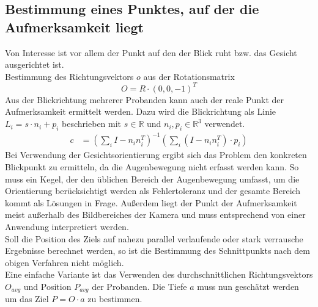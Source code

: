 \subsection{Bestimmung eines Punktes, auf der die Aufmerksamkeit liegt}
Von Interesse ist vor allem der Punkt auf den der Blick ruht bzw. das Gesicht ausgerichtet ist.\\
Bestimmung des Richtungsvektors $o$ aus der Rotationsmatrix
\[O= R\cdot (0,0,-1)^T\] 
Aus der Blickrichtung mehrerer Probanden kann auch der reale Punkt der Aufmerksamkeit ermittelt werden. Dazu wird die Blickrichtung als Linie $L_i = s \cdot n_i+ p_i$ beschrieben mit $s\in \mathbb{R}$ und $n_i,p_i \in \mathbb{R}^3$ verwendet.
\begin{align*}
c&=(\sum_{i} I -n_in_i^T)^{-1}
(\sum_{i} (I -n_in_i^T)\cdot p_i)
\end{align*}
Bei Verwendung der Gesichtsorientierung ergibt sich das Problem den konkreten Blickpunkt zu ermitteln, da die Augenbewegung nicht erfasst werden kann.
So muss ein Kegel, der den üblichen Bereich der Augenbewegung umfasst, um die Orientierung berücksichtigt werden als Fehlertoleranz und der gesamte Bereich kommt als Lösungen in Frage.
Außerdem liegt der Punkt der Aufmerksamkeit meist außerhalb des Bildbereiches der Kamera und muss entsprechend von einer Anwendung interpretiert werden.\\
Soll die Position des Ziels auf nahezu parallel verlaufende oder stark verrausche Ergebnisse berechnet werden, so ist die Bestimmung des Schnittpunkts nach dem obigen Verfahren nicht möglich.\\
Eine einfache Variante ist das Verwenden des durchschnittlichen Richtungsvektors $O_{avg}$ und Position $P_{avg}$ der Probanden. Die Tiefe $a$ muss nun geschätzt werden um das Ziel $P=O\cdot a$ zu bestimmen.
